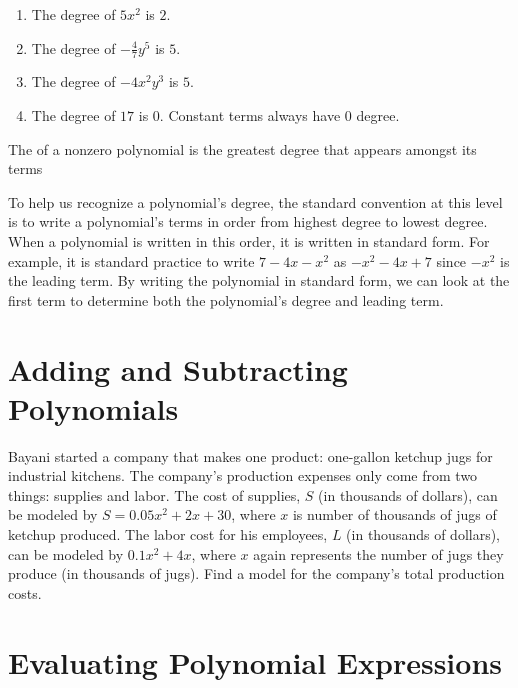 \documentclass{ximera}
\begin{document}
\begin{example}
  \begin{enumerate}
  \item The degree of $5x^2$ is $2$.
  \item The degree of $-\frac{4}{7}y^5$ is $5$.
  \item     The degree of $-4x^2y^3$ is $5$.
  \item  The degree of $17$ is $0$. Constant terms always have $0$ degree.
  \end{enumerate}
\end{example}

\begin{definition}
  The  of a nonzero polynomial
  is the greatest degree that appears amongst its terms
\end{definition}
\begin{remark}
   To help us recognize a polynomial's degree,
        the standard convention at this level is to write a polynomial's terms in order from highest degree to lowest degree.
        When a polynomial is written in this order,
        it is written in standard form.
        For example,
        it is standard practice to write $7-4x-x^2$ as
        $-x^2-4x+7$ since $-x^2$ is the leading term.
        By writing the polynomial in standard form,
        we can look at the first term to determine both the polynomial's degree and leading term.
\end{remark}

\section{Adding and Subtracting Polynomials}
        Bayani started a company that makes one product: one-gallon ketchup jugs for industrial kitchens.
        The company's production expenses only come from two things:
        supplies and labor.
        The cost of supplies, $S$
        (in thousands of dollars),
        can be modeled by $S=0.05x^2+2x+30$,
        where $x$ is number of thousands of jugs of ketchup produced.
        The labor cost for his employees, $L$
        (in thousands of dollars),
        can be modeled by $0.1x^2+4x$,
        where $x$ again represents the number of jugs they produce
        (in thousands of jugs).
        Find a model for the company's total production costs.

\section{Evaluating Polynomial Expressions}
\end{document}
